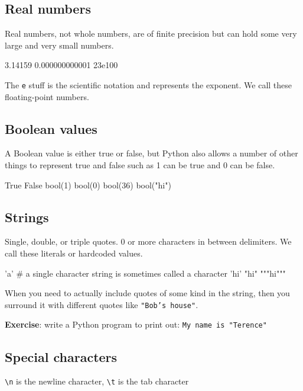 \begin{fullwidth}
\subsection{Real numbers}
 
Real numbers, not whole numbers, are of finite precision but can hold some very large and very small numbers.

\begin{pyconsole}
3.14159
0.000000000001
23e100
\end{pyconsole}

The {\tt e} stuff is the scientific notation and represents the exponent. We call these floating-point numbers.

\subsection{Boolean values}

A Boolean value is either true or false, but Python also allows a number of other things to represent true and false such as 1 can be true and 0 can be false.

\begin{pyconsole}
True
False
bool(1)
bool(0)
bool(36)
bool("hi")
\end{pyconsole}

\subsection{Strings}

Single, double, or triple quotes. 0 or more characters in between delimiters. We call these literals or hardcoded values.

\begin{pyconsole}
'a'  # a single character string is sometimes called a character
'hi'
"hi"
"""hi"""
\end{pyconsole}

When you need to actually include quotes of some kind in the string, then you surround it with different quotes like {\tt "Bob's house"}.

{\bf Exercise}: write a Python program to print out: {\tt My name is "Terence"}

\subsection{Special characters}

{\tt \textbackslash n}  is the newline character, {\tt \textbackslash t}  is the tab character



\end{fullwidth}

